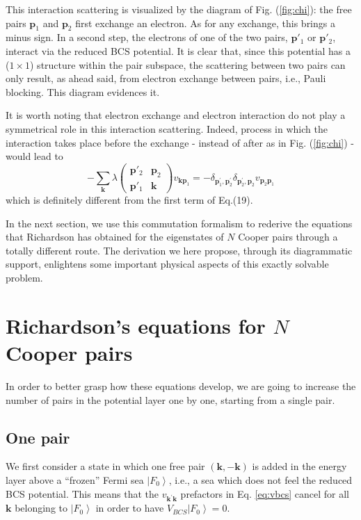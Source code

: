 \documentclass[epj]{svjour}
\newcommand{\vk}{\ensuremath{\mathbf{k}}}
\newcommand{\vp}{\ensuremath{\mathbf{p}}}
\begin{document}
This interaction scattering is visualized by the diagram of Fig. (\ref{fig:chi}): the free pairs $\mathbf{p}_1$ and $\mathbf{p}_2$ first
exchange an electron. As for any exchange, this brings a minus sign. In a
second step, the electrons of one of the two pairs, $\mathbf{p}' _1$ or ${\mathbf{p}}' _2$,  interact via the reduced BCS
potential. It is clear that, since this potential has a ($1\times1$)
structure within the pair subspace, the scattering between two pairs can only result, as ahead said, from
electron exchange between pairs, i.e., Pauli blocking. This diagram evidences it.

It is worth noting that electron exchange and electron interaction do not play a symmetrical role in this interaction scattering. Indeed, process in which the interaction takes place before the exchange - instead of after as in Fig. (\ref{fig:chi}) - would lead to
\begin{equation}
-\sum_\vk \lambda\left(%
\begin{smallmatrix}\vp'_2&\vp_2\\\vp'_1&\mathbf{k}\end{smallmatrix}\right)v_{\mathbf{k}\mathbf{p} _1 } =-\delta_{\mathbf{p}
^{\prime}_1,\mathbf{p}^{\prime} _2}\delta_{\mathbf{p}
^{\prime}_2,\mathbf{p} _2}v_{\mathbf{p} _2\mathbf{p} _1}
\end{equation}
which is definitely different from the first term of Eq.(19).

In the next section, we use this commutation formalism to rederive the equations that Richardson has obtained for the eigenstates of $N$ Cooper pairs through a totally different route. The  derivation we here propose, through its diagrammatic support, enlightens some important physical aspects of this exactly solvable problem.

\section{Richardson's equations for $N$ Cooper pairs\label{sec:rich}}

In order to better grasp how these equations develop, we are going to increase the number of pairs in the potential layer one by one, starting from a single pair.

\subsection{One pair}

We first consider a state in which one free pair $(\mathbf{k} ,-\mathbf{k} )$ is added in the energy layer above a
``frozen'' Fermi sea $\left|F_0\right> $, i.e., a sea which does not feel the reduced BCS potential.
This means that the $v_{\mathbf{k} ^{\prime}\mathbf{k} }$ prefactors in Eq.%
\eqref{eq:vbcs} cancel for all $\mathbf{k} $ belonging to $\left|F_0\right> $ in order to have $V_{BCS} \left|F_0\right>=0$.
\end{document}
